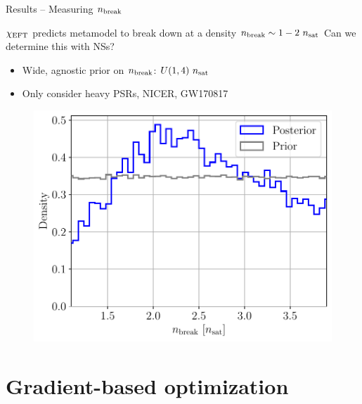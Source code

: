 \documentclass[usenames,dvipsnames,t]{beamer}
\begin{document}
\begin{frame}{Results -- Measuring $n_{\rm{break}}$}

  \def\x{2mm}
  \def\y{2mm}

  $\chi_{\rm{EFT}}$ predicts metamodel to break down at a density $n_{\rm{break}} \sim 1-2 \ n_{\rm{sat}}$ 
  Can we determine this with NSs?

  \begin{itemize}
    \vspace{\y}
    \item Wide, agnostic prior on $n_{\rm{break}}$: $U(1, 4) \ n_{\rm{sat}}$

    \vspace{\y}
    \item Only consider heavy PSRs, NICER, GW170817

  \end{itemize}

  \vspace{\x}

  \begin{figure}
    \centering
    \includegraphics[width=0.55\linewidth]{Figures/nbreak_posterior.pdf}
  \end{figure}

\end{frame}

\section{Gradient-based optimization}
\end{document}
